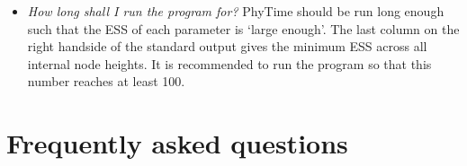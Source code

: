 \documentclass[a4paper,12pt]{article}
\newcommand{\x}[1]{\texttt{#1}}
\begin{document}
\begin{itemize}




\item {\em How  long shall I run the program  for?} PhyTime should be run long  enough such that the
ESS of  each parameter  is `large enough'.  The last column  on the  right handside of  the standard
output gives the minimum ESS across all internal  node heights. It is recommended to run the program
so that this number reaches at least 100.

\end{itemize}


\section{Frequently asked questions}
\end{document}
